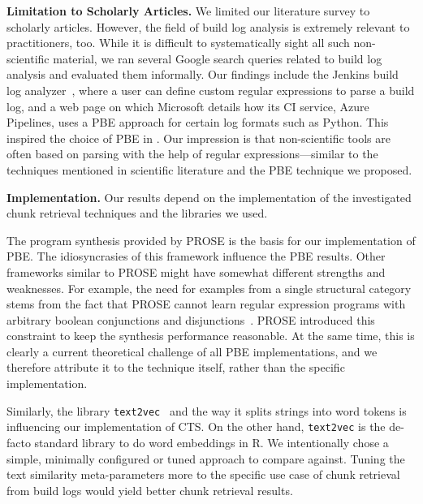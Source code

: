 \textbf{Limitation to Scholarly Articles.} We limited our literature
survey to scholarly articles.
However, the field of build log analysis is extremely relevant to
practitioners, too.
While it is difficult to systematically sight all such non-scientific
material, we ran several Google search queries related to build log
analysis and evaluated them informally.
Our findings include the Jenkins build log
analyzer~\cite{jenkins2020failure-analyzer}, where a user can
define custom regular expressions to parse a build log, and a web page
on which Microsoft details how its CI service, Azure Pipelines, uses a
PBE approach for certain log formats such as Python.
This inspired the choice of PBE in .
Our impression is that non-scientific tools are often based on
parsing with the help of regular expressions---similar to the
techniques mentioned in scientific literature and the PBE technique
we proposed.

\textbf{Implementation.}
Our results depend on the implementation of the investigated chunk
retrieval techniques and the libraries we used.

The program synthesis
provided by PROSE is the basis for our implementation of PBE\@.
The
idiosyncrasies of this framework influence the PBE results.
Other
frameworks similar to PROSE might have somewhat different strengths
and weaknesses.
For example, the need for examples from a single
structural category stems from the fact that PROSE cannot learn
regular expression programs with arbitrary boolean conjunctions and
disjunctions~\cite{mayer2015user}.
PROSE introduced this constraint
to keep the synthesis performance reasonable.
At the same time, this
is clearly a current theoretical challenge of all PBE implementations,
and we therefore attribute it to the technique itself, rather than the
specific implementation.

Similarly, the library
{\tt text2vec}~\cite{text2vec2019webpage}
and the way it splits strings into word tokens is influencing
our implementation of CTS\@.
On the other hand,
{\tt text2vec} is the de-facto standard library to do word embeddings
in R.
We intentionally chose a simple, minimally configured or tuned
approach to compare against.
Tuning the text similarity
meta-parameters more to the specific use case of chunk retrieval from
build logs would yield better chunk retrieval results.

